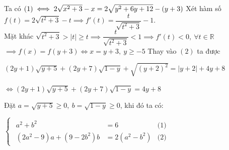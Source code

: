\documentclass[a4paper, 12pt]{article}
\numberwithin{equation}{section}
\begin{document}
    Ta có $(1) \iff 2\sqrt{x^2 + 3} - x = 2\sqrt{y^2 + 6y + 12} - (y + 3)\\$
    Xét hàm số $f(t) = 2\sqrt{t^2 + 3} - t \implies f'(t) = \dfrac{t}{\sqrt{t^2 + 3}} - 1.$\\
    Mặt khác $\sqrt{t^2 + 3} > |t| \geq t \implies \dfrac{t}{\sqrt{t^2 + 3}} < 1 \implies f'(t) < 0, \ \forall t \in \mathbb{R}$\\
    $\implies f(x) = f(y+3) \iff x = y + 3,\ y \geq -5$ Thay vào $(2)$ ta được
    
    $(2y + 1)\sqrt{y+5} + (2y+7)\sqrt{1-y} + \sqrt{(y+2)^2} = |y+2| + 4y + 8$
    
    $\iff (2y + 1)\sqrt{y+5} + (2y+7)\sqrt{1-y} = 4y + 8$
    
    Đặt $a = \sqrt{y + 5} \geq 0,\ b = \sqrt{1 - y} \geq0$, khi đó ta có:
    
    $\left\{
        \begin{gathered}
        \begin{aligned}
            a^2 + b^2 &= 6 &\text{(1)}\\
            (2a^2 - 9)a + (9 - 2b^2)b &= 2(a^2 - b^2) &\text{(2)}
        \end{aligned}
        \end{gathered}
    \right.$
    
\end{document}

